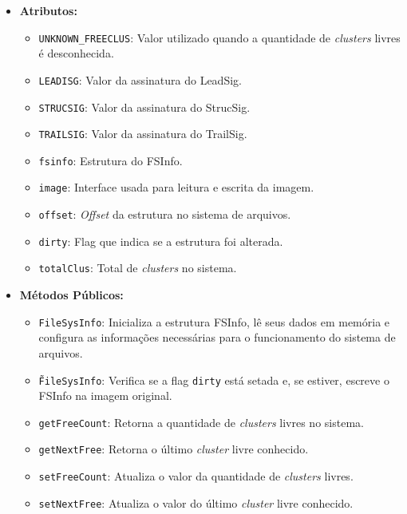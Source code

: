 \documentclass[
    12pt,				%
    oneside,   	        %
    a4paper,			%
    english,			%
    french,				%
    spanish,			%
    brazil,				%
    ]{pacotes/abntex2}
\begin{document}
\begin{itemize}
    \item \textbf{Atributos:}
        \begin{itemize}
            \item \texttt{UNKNOWN\_FREECLUS}: Valor utilizado quando a quantidade de \textit{clusters} livres é desconhecida.
            \item \texttt{LEADISG}: Valor da assinatura do LeadSig.
            \item \texttt{STRUCSIG}: Valor da assinatura do StrucSig.
            \item \texttt{TRAILSIG}: Valor da assinatura do TrailSig.
            \item \texttt{fsinfo}: Estrutura do FSInfo.
            \item \texttt{image}: Interface usada para leitura e escrita da imagem.
            \item \texttt{offset}: \textit{Offset} da estrutura no sistema de arquivos.
            \item \texttt{dirty}: Flag que indica se a estrutura foi alterada.
            \item \texttt{totalClus}: Total de \textit{clusters} no sistema.
        \end{itemize}
    \item \textbf{Métodos Públicos:}
        \begin{itemize}
            \item \texttt{FileSysInfo}: Inicializa a estrutura FSInfo, lê seus dados em memória e configura as informações necessárias para o funcionamento do sistema de arquivos.
            \item \texttt{\~FileSysInfo}: Verifica se a flag \texttt{dirty} está setada e, se estiver, escreve o FSInfo na imagem original.
            \item \texttt{getFreeCount}: Retorna a quantidade de \textit{clusters} livres no sistema.
            \item \texttt{getNextFree}: Retorna o último \textit{cluster} livre conhecido.
            \item \texttt{setFreeCount}: Atualiza o valor da quantidade de \textit{clusters} livres.
            \item \texttt{setNextFree}: Atualiza o valor do último \textit{cluster} livre conhecido.
        \end{itemize}
\end{itemize}
\end{document}
